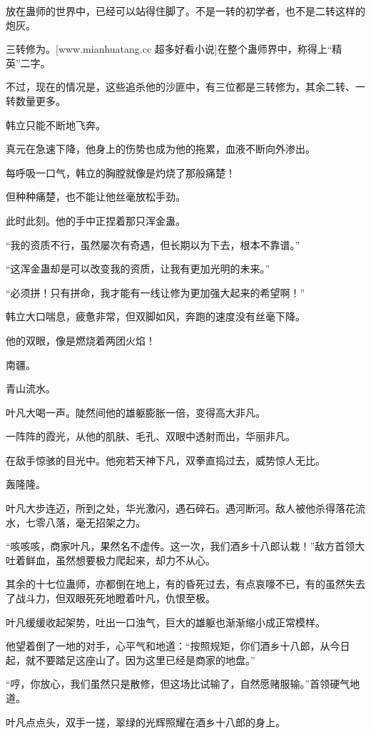 \begin{this_body}
放在蛊师的世界中，已经可以站得住脚了。不是一转的初学者，也不是二转这样的炮灰。

三转修为。[www.mianhuatang.cc 超多好看小说]在整个蛊师界中，称得上“精英”二字。

不过，现在的情况是，这些追杀他的沙匪中，有三位都是三转修为，其余二转、一转数量更多。

韩立只能不断地飞奔。

真元在急速下降，他身上的伤势也成为他的拖累，血液不断向外渗出。

每呼吸一口气，韩立的胸膛就像是灼烧了那般痛楚！

但种种痛楚，也不能让他丝毫放松手劲。

此时此刻。他的手中正捏着那只浑金蛊。

“我的资质不行，虽然屡次有奇遇，但长期以为下去，根本不靠谱。”

“这浑金蛊却是可以改变我的资质，让我有更加光明的未来。”

“必须拼！只有拼命，我才能有一线让修为更加强大起来的希望啊！”

韩立大口喘息，疲惫非常，但双脚如风，奔跑的速度没有丝毫下降。

他的双眼，像是燃烧着两团火焰！

南疆。

青山流水。

叶凡大喝一声。陡然间他的雄躯膨胀一倍，变得高大非凡。

一阵阵的霞光，从他的肌肤、毛孔、双眼中透射而出，华丽非凡。

在敌手惊骇的目光中。他宛若天神下凡，双拳直捣过去，威势惊人无比。

轰隆隆。

叶凡大步连迈，所到之处，华光激闪，遇石碎石。遇河断河。敌人被他杀得落花流水，七零八落，毫无招架之力。

“咳咳咳，商家叶凡，果然名不虚传。这一次，我们酒乡十八郎认栽！”敌方首领大吐着鲜血，虽然想要极力爬起来，却力不从心。

其余的十七位蛊师，亦都倒在地上，有的昏死过去，有点哀嚎不已，有的虽然失去了战斗力，但双眼死死地瞪着叶凡，仇恨至极。

叶凡缓缓收起架势，吐出一口浊气，巨大的雄躯也渐渐缩小成正常模样。

他望着倒了一地的对手，心平气和地道：“按照规矩，你们酒乡十八郎，从今日起，就不要踏足这座山了。因为这里已经是商家的地盘。”

“哼，你放心，我们虽然只是散修，但这场比试输了，自然愿赌服输。”首领硬气地道。

叶凡点点头，双手一搓，翠绿的光辉照耀在酒乡十八郎的身上。


\end{this_body}
